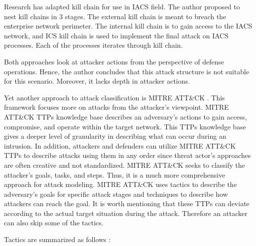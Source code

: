 Research  \citeauthor{77-ics-kill-chain} \parencite{77-ics-kill-chain} has adapted \citeauthor{78-kill-chain} \parencite{78-kill-chain} kill chain for use in IACS field. The author proposed to nest kill chains in 3 stages. The external kill chain is meant to breach the enterprise network perimeter. The internal kill chain is to gain access to the IACS network, and ICS kill chain is used to implement the final attack on IACS processes. Each of the processes iterates through \citeauthor{78-kill-chain} \parencite{78-kill-chain} kill chain.



Both approaches \parencite{78-kill-chain, 77-ics-kill-chain} look at attacker actions from the perspective of defense operations. Hence, the author concludes that this attack structure is not suitable for this scenario. Moreover, it lacks depth in attacker actions.

Yet another approach to attack classification is MITRE ATT\&CK \parencite{WEB-08-mitre-att}. This framework focuses more on attacks from the attacker's viewpoint. MITRE ATT\&CK TTPs knowledge base describes an adversary's actions to gain access, compromise, and operate within the target network. This TTPs knowledge base gives a deeper level of granularity in describing what can occur during an intrusion. In addition, attackers and defenders can utilize MITRE ATT\&CK TTPs to describe attacks using them in any order since threat actor's approaches are often creative and not standardized. MITRE ATT\&CK  seeks to classify the attacker's goals, tasks, and steps. Thus, it is a much more comprehensive approach for attack modeling. MITRE ATT\&CK uses tactics to describe the adversary's goals for specific attack stages and techniques to describe how attackers can reach the goal. It is worth mentioning that these TTPs can deviate according to the actual target situation during the attack. Therefore an attacker can also skip some of the tactics.

Tactics are summarized as follows \parencite{WEB-08-mitre-att}:

